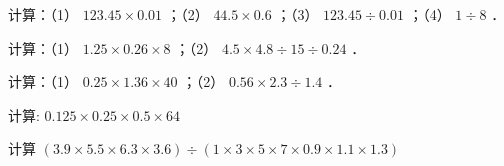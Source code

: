 \begin{lianxi}
	\begin{problems}
		计算：（1） $123.45 \times 0.01$ ；（2） $44.5 \times 0.6$ ；（3） $123.45 \div 0.01$ ；（4） $1 \div 8$ ．
	\end{problems} 
	
	\begin{lxMsol}
		\vspace{\solthreeproblems}
	\end{lxMsol}
\end{lianxi}


\begin{example}
	\begin{problems}
		计算：（1） $1.25 \times 0.26 \times 8$ ；（2） $4.5 \times 4.8 \div 15 \div 0.24$ ．
		
	\end{problems} 
	
	\begin{Ssol}
		\vspace{\solthreeproblems}
	\end{Ssol}
\end{example}


\begin{lianxi}
	\begin{problems}
		计算：（1） $0.25 \times 1.36 \times 40$ ；（2） $0.56 \times 2.3 \div 1.4$ ．
		
	\end{problems} 
	
	\begin{lxMsol}
		\vspace{\solthreeproblems}
	\end{lxMsol}
\end{lianxi}
\begin{example}
	计算: $0.125 \times 0.25 \times 0.5 \times 64$

	
	\begin{Ssol}
		\vspace{\solfourproblems}
	\end{Ssol}
\end{example}



\begin{example}
计算 $(3.9 \times 5.5 \times 6.3 \times 3.6) \div(1 \times 3 \times 5 \times 7 \times 0.9 \times 1.1 \times 1.3)$	
	
	\begin{Ssol}
		\vspace{\solfourproblems}
	\end{Ssol}
\end{example}


